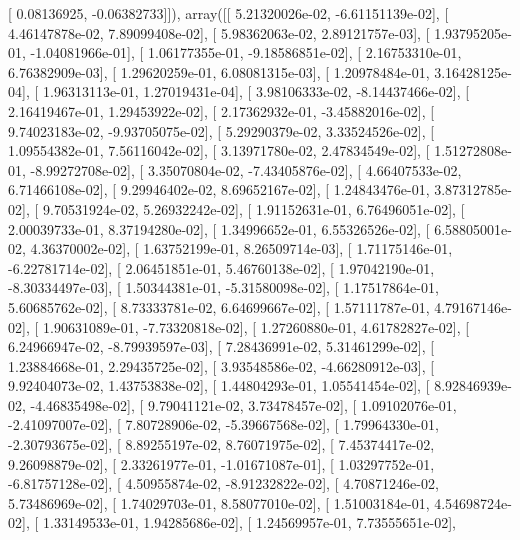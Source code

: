 \documentclass{article}
\begin{document}
       [ 0.08136925, -0.06382733]]), array([[  5.21320026e-02,  -6.61151139e-02],
       [  4.46147878e-02,   7.89099408e-02],
       [  5.98362063e-02,   2.89121757e-03],
       [  1.93795205e-01,  -1.04081966e-01],
       [  1.06177355e-01,  -9.18586851e-02],
       [  2.16753310e-01,   6.76382909e-03],
       [  1.29620259e-01,   6.08081315e-03],
       [  1.20978484e-01,   3.16428125e-04],
       [  1.96313113e-01,   1.27019431e-04],
       [  3.98106333e-02,  -8.14437466e-02],
       [  2.16419467e-01,   1.29453922e-02],
       [  2.17362932e-01,  -3.45882016e-02],
       [  9.74023183e-02,  -9.93705075e-02],
       [  5.29290379e-02,   3.33524526e-02],
       [  1.09554382e-01,   7.56116042e-02],
       [  3.13971780e-02,   2.47834549e-02],
       [  1.51272808e-01,  -8.99272708e-02],
       [  3.35070804e-02,  -7.43405876e-02],
       [  4.66407533e-02,   6.71466108e-02],
       [  9.29946402e-02,   8.69652167e-02],
       [  1.24843476e-01,   3.87312785e-02],
       [  9.70531924e-02,   5.26932242e-02],
       [  1.91152631e-01,   6.76496051e-02],
       [  2.00039733e-01,   8.37194280e-02],
       [  1.34996652e-01,   6.55326526e-02],
       [  6.58805001e-02,   4.36370002e-02],
       [  1.63752199e-01,   8.26509714e-03],
       [  1.71175146e-01,  -6.22781714e-02],
       [  2.06451851e-01,   5.46760138e-02],
       [  1.97042190e-01,  -8.30334497e-03],
       [  1.50344381e-01,  -5.31580098e-02],
       [  1.17517864e-01,   5.60685762e-02],
       [  8.73333781e-02,   6.64699667e-02],
       [  1.57111787e-01,   4.79167146e-02],
       [  1.90631089e-01,  -7.73320818e-02],
       [  1.27260880e-01,   4.61782827e-02],
       [  6.24966947e-02,  -8.79939597e-03],
       [  7.28436991e-02,   5.31461299e-02],
       [  1.23884668e-01,   2.29435725e-02],
       [  3.93548586e-02,  -4.66280912e-03],
       [  9.92404073e-02,   1.43753838e-02],
       [  1.44804293e-01,   1.05541454e-02],
       [  8.92846939e-02,  -4.46835498e-02],
       [  9.79041121e-02,   3.73478457e-02],
       [  1.09102076e-01,  -2.41097007e-02],
       [  7.80728906e-02,  -5.39667568e-02],
       [  1.79964330e-01,  -2.30793675e-02],
       [  8.89255197e-02,   8.76071975e-02],
       [  7.45374417e-02,   9.26098879e-02],
       [  2.33261977e-01,  -1.01671087e-01],
       [  1.03297752e-01,  -6.81757128e-02],
       [  4.50955874e-02,  -8.91232822e-02],
       [  4.70871246e-02,   5.73486969e-02],
       [  1.74029703e-01,   8.58077010e-02],
       [  1.51003184e-01,   4.54698724e-02],
       [  1.33149533e-01,   1.94285686e-02],
       [  1.24569957e-01,   7.73555651e-02],
\end{document}
